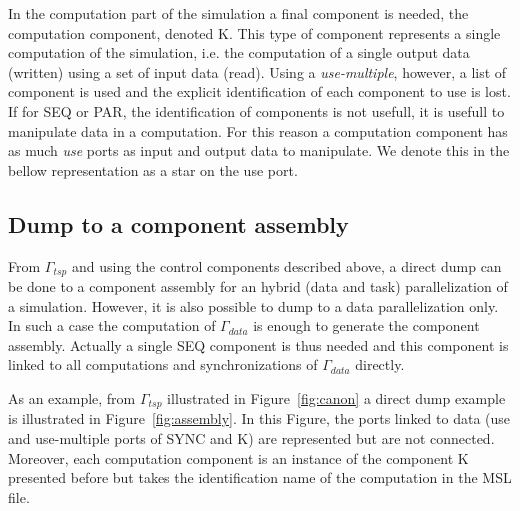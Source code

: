 In the computation part of the simulation a final component is needed, the computation component, denoted K. This type of component represents a single computation of the simulation, i.e. the computation of a single output data (written) using a set of input data (read). Using a \emph{use-multiple}, however, a list of component is used and the explicit identification of each component to use is lost. If for SEQ or PAR, the identification of components is not usefull, it is usefull to manipulate data in a computation. For this reason a computation component has as much \emph{use} ports as input and output data to manipulate. We denote this in the bellow representation as a star on the use port.



\subsection{Dump to a component assembly}
From $\Gamma_{tsp}$ and using the control components described above, a direct dump can be done to a component assembly for an hybrid (data and task) parallelization of a simulation. However, it is also possible to dump to a data parallelization only. In such a case the computation of $\Gamma_{data}$ is enough to generate the component assembly. Actually a single SEQ component is thus needed and this component is linked to all computations and synchronizations of $\Gamma_{data}$ directly.

As an example, from $\Gamma_{tsp}$ illustrated in Figure~\ref{fig:canon} a direct dump example is illustrated in Figure~\ref{fig:assembly}. In this Figure, the ports linked to data (use and use-multiple ports of SYNC and K) are represented but are not connected. Moreover, each computation component is an instance of the component K presented before but takes the identification name of the computation in the MSL file.

